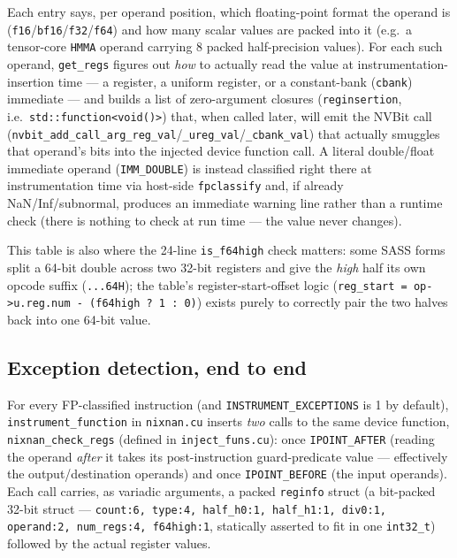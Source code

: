 \documentclass[11pt]{article}
\begin{document}
Each entry says, per operand position, which floating-point format the
operand is (\texttt{f16}/\texttt{bf16}/\texttt{f32}/\texttt{f64}) and how
many scalar values are packed into it (e.g.\ a tensor-core \texttt{HMMA}
operand carrying 8 packed half-precision values). For each such operand,
\texttt{get\_regs} figures out \emph{how} to actually read the value at
instrumentation-insertion time --- a register, a uniform register, or a
constant-bank (\texttt{cbank}) immediate --- and builds a list of
zero-argument closures (\texttt{reginsertion}, i.e.\
\texttt{std::function<void()>}) that, when called later, will emit the
NVBit call
(\texttt{nvbit\_add\_call\_arg\_reg\_val}/\texttt{\_ureg\_val}/\texttt{\_cbank\_val})
that actually smuggles that operand's bits into the injected device
function call. A literal double/float immediate operand
(\texttt{IMM\_DOUBLE}) is instead classified right there at instrumentation
time via host-side \texttt{fpclassify} and, if already NaN/Inf/subnormal,
produces an immediate warning line rather than a runtime check (there is
nothing to check at run time --- the value never changes).

This table is also where the 24-line \texttt{is\_f64high} check matters:
some SASS forms split a 64-bit double across two 32-bit registers and
give the \emph{high} half its own opcode suffix (\texttt{...64H}); the
table's register-start-offset logic (\texttt{reg\_start = op->u.reg.num -
(f64high ? 1 : 0)}) exists purely to correctly pair the two halves back
into one 64-bit value.

\subsection{Exception detection, end to end}
\label{sec:exceptions}

For every FP-classified instruction (and \texttt{INSTRUMENT\_EXCEPTIONS} is
1 by default), \texttt{instrument\_function} in \texttt{nixnan.cu} inserts
\emph{two} calls to the same device function, \texttt{nixnan\_check\_regs}
(defined in \texttt{inject\_funs.cu}): once \texttt{IPOINT\_AFTER} (reading
the operand \emph{after} it takes its post-instruction guard-predicate
value --- effectively the output/destination operands) and once
\texttt{IPOINT\_BEFORE} (the input operands). Each call carries, as
variadic arguments, a packed \texttt{reginfo} struct (a bit-packed 32-bit
struct --- \texttt{count:6, type:4, half\_h0:1, half\_h1:1, div0:1,
operand:2, num\_regs:4, f64high:1}, statically asserted to fit in one
\texttt{int32\_t}) followed by the actual register values.
\end{document}
